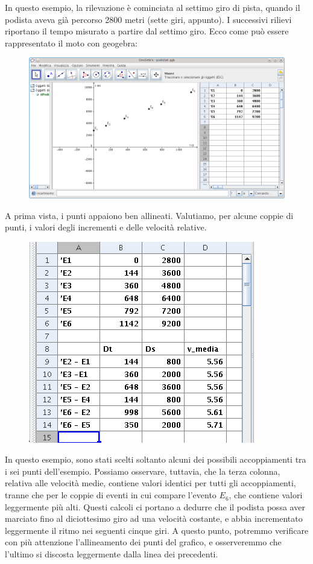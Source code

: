 In questo esempio, la rilevazione è cominciata al settimo giro di pista, quando il podista aveva già percorso 2800 metri (sette giri, appunto). I successivi rilievi riportano il tempo misurato a partire dal settimo giro. Ecco come può essere rappresentato il moto con geogebra:
\begin{figure}[H]
 \centering
 \includegraphics[width=.7\textwidth]{../immagini/podista.png}
 \label{fig:il grafico spazio tempo di un podista}
\end{figure}

A prima vista, i punti appaiono ben allineati. Valutiamo, per alcune coppie di punti, i valori degli incrementi e delle velocità relative.
\begin{figure}[H]
 \centering
 \includegraphics[width=.7\textwidth]{../immagini/podista1.png}
 \label{fig:il grafico spazio tempo di un podista}
\end{figure}

In questo esempio, sono stati scelti soltanto alcuni dei possibili accoppiamenti tra i sei punti dell'esempio. Possiamo osservare, tuttavia, che la terza colonna, relativa alle velocità medie, contiene valori identici per tutti gli accoppiamenti, tranne che per le coppie di eventi in cui compare l'evento $E_6$, che contiene valori leggermente più alti.\newline
Questi calcoli ci portano a dedurre che il podista possa aver marciato fino al diciottesimo giro ad una velocità costante, e abbia incrementato leggermente il ritmo nei seguenti cinque giri.\newline
A questo punto, potremmo verificare con più attenzione l'allineamento dei punti del grafico, e osserveremmo che l'ultimo si discosta leggermente dalla linea dei precedenti.
\newline

